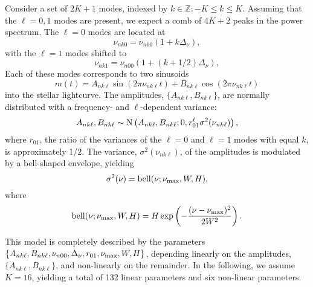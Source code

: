 \documentclass[modern]{aastex61}
\newcommand{\normal}{\ensuremath{{\rm N}}}
\newcommand{\nukl}{\ensuremath{\nu_{nk\ell}}}
\newcommand{\nukzero}{\ensuremath{\nu_{nk0}}}
\newcommand{\nukone}{\ensuremath{\nu_{nk1}}}
\newcommand{\nuzero}{\ensuremath{\nu_{n00}}}
\newcommand{\dnu}{\ensuremath{\Delta_\nu}}
\newcommand{\numax}{\ensuremath{\nu_{\rm max}}}
\newcommand{\numod}{\ensuremath{{\rm bell}}}
\newcommand{\amps}{\ensuremath{A_{nk\ell}}}
\newcommand{\ampc}{\ensuremath{B_{nk\ell}}}
\newcommand{\rl}{\ensuremath{r_{01}}}
\begin{document}
Consider a set of $2K+1$ modes, indexed by $k \in \mathbb{Z}: -K \le k \le K$. Assuming that the $\ell = 0, 1$ modes are present, we expect a comb of $4K+2$ peaks in the power spectrum. The $\ell = 0$ modes are located at
\begin{equation}
\nukzero = \nuzero (1 + k \dnu), 
\end{equation}
with the $\ell = 1$ modes shifted to
\begin{equation}
\nukone = \nuzero (1 + (k + 1/2) \dnu), 
\end{equation}
Each of these modes corresponds to two sinusoids
\begin{equation}
m(t) = \amps \sin(2\pi\nukl t) + \ampc \cos(2\pi\nukl t)
\end{equation}
into the stellar lightcurve. The amplitudes, $\{\amps, \ampc\}$, are normally distributed with a frequency- and $\ell$-dependent variance:
\begin{equation}
\amps, \ampc \sim \normal \left(\amps, \ampc; 0, \rl^\ell \sigma^2(\nukl) \right),
\end{equation}
where $\rl$, the ratio of the variances of the $\ell = 0$ and $\ell = 1$ modes with equal $k$, is approximately 1/2. The variance, $\sigma^2(\nukl)$, of the amplitudes is modulated by a bell-shaped envelope, yielding
\begin{equation}
\sigma^2(\nu) = \numod(\nu; \numax, W, H),
\end{equation}
where
\begin{equation}
\numod(\nu; \numax, W, H) = H \exp \left( -\frac{(\nu - \numax)^2}{2 W^2} \right).
\end{equation}

This model is completely described by the parameters $\{ \amps, \ampc, \nuzero, \dnu, \rl, \numax, W, H \}$, depending linearly on the amplitudes, $\{\amps, \ampc\}$, and non-linearly on the remainder. In the following, we assume $K=16$, yielding a total of 132 linear parameters and six non-linear parameters.
\end{document}
